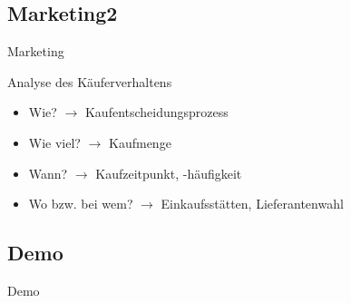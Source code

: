 \documentclass{beamer}
\begin{document}
\subsection{Marketing2}
\begin{frame}{Marketing}

\begin{block}{Analyse des Käuferverhaltens}
	\begin{itemize}
		\item	Wie? \hspace{2.1cm} $\rightarrow$ \hspace{0.5cm} Kaufentscheidungsprozess
		\item	Wie viel? \hspace{1.45cm} $\rightarrow$ \hspace{0.5cm} Kaufmenge
		\item	Wann? \hspace{1.8cm} $\rightarrow$ \hspace{0.5cm} Kaufzeitpunkt, -häufigkeit
		\item	Wo bzw. bei wem?  $\rightarrow$ \hspace{0.5cm} Einkaufsstätten, Lieferantenwahl
	\end{itemize}
\end{block}

\end{frame}

\subsection{Demo}
\begin{frame}{Demo}
	
\end{frame}
\end{document}
